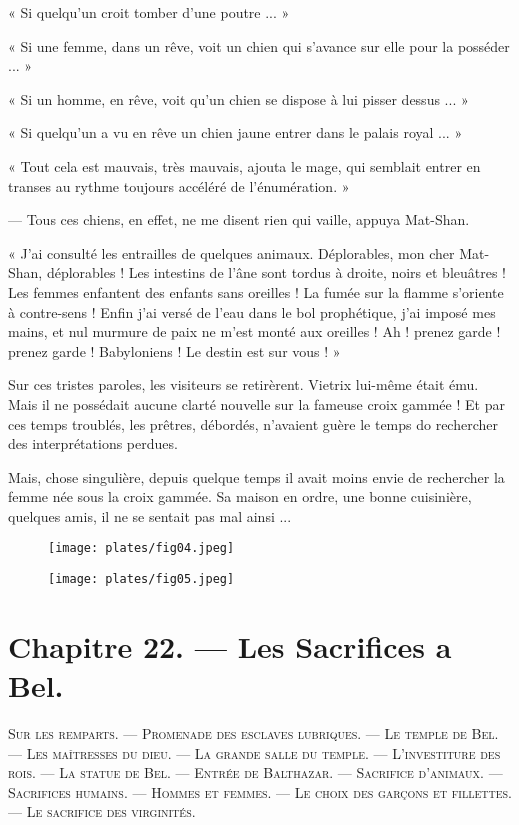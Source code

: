 \documentclass[a4paper, 11pt, oneside, polutonikogreek, french]{article}
\begin{document}
« Si quelqu'un croit tomber d'une poutre ... »

« Si une femme, dans un rêve, voit un chien qui s'avance sur elle pour la posséder ... »

« Si un homme, en rêve, voit qu'un chien se dispose à lui pisser dessus ... »

« Si quelqu'un a vu en rêve un chien jaune entrer dans le palais royal ... »

\bigskip
\centerline{\EightStarTaper}
\centerline{\EightStarTaper\EightStarTaper}
\bigskip

« Tout cela est mauvais, très mauvais, ajouta le mage, qui semblait entrer en transes au rythme toujours accéléré de l'énumération. »

--- Tous ces chiens, en effet, ne me disent rien qui vaille, appuya Mat-Shan.

« J'ai consulté les entrailles de quelques animaux. Déplorables, mon cher Mat-Shan, déplorables ! Les intestins de l'âne sont tordus à droite, noirs et bleuâtres ! Les femmes enfantent des enfants sans oreilles ! La fumée sur la flamme s'oriente à contre-sens ! Enfin j'ai versé de l'eau dans le bol prophétique, j'ai imposé mes mains, et nul murmure de paix ne m'est monté aux oreilles ! Ah ! prenez garde ! prenez garde ! Babyloniens ! Le destin est sur vous ! »

Sur ces tristes paroles, les visiteurs se retirèrent. Vietrix lui-même était ému. Mais il ne possédait aucune clarté nouvelle sur la fameuse croix gammée ! Et par ces temps troublés, les prêtres, débordés, n'avaient guère le temps do rechercher des interprétations perdues.

Mais, chose singulière, depuis quelque temps il avait moins envie de rechercher la femme née sous la croix gammée. Sa maison en ordre, une bonne cuisinière, quelques amis, il ne se sentait pas mal ainsi ...

\begin{figure}[H]
\centering
\texttt{[image: plates/fig04.jpeg]}
\end{figure}
\clearpage
\begin{figure}[H]
\centering
\texttt{[image: plates/fig05.jpeg]}
\end{figure}
\section{Chapitre 22. --- Les Sacrifices a Bel.}
\begin{center}
\scshape
\small
Sur les remparts. --- Promenade des esclaves lubriques. --- Le temple de Bel. --- Les maîtresses du dieu. --- La grande salle du temple. --- L'investiture des rois. --- La statue de Bel. --- Entrée de Balthazar. --- Sacrifice d'animaux. --- Sacrifices humains. --- Hommes et femmes. --- Le choix des garçons et fillettes. --- Le sacrifice des virginités.
\end{center}
\end{document}

